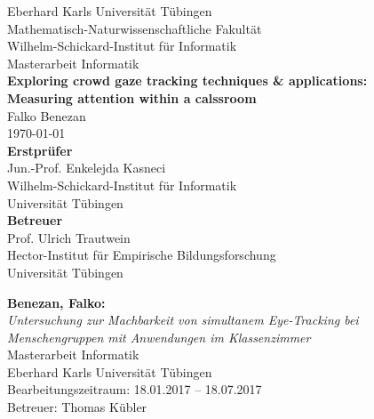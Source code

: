 \documentclass[twoside,12pt,a4paper]{scrreprt}
\begin{document}
\begin{titlepage}
	\begin{center}
		\LARGE Eberhard Karls Universität Tübingen\\
		\large Mathematisch-Naturwissenschaftliche Fakultät \\
		Wilhelm-Schickard-Institut für Informatik\\
		[3cm]
		\huge Masterarbeit Informatik\\
		[2cm]
		\Large\textbf{Exploring crowd gaze tracking techniques \& applications:\\Measuring attention within a calssroom}\\
		[1.5cm]
		\large Falko Benezan\\
		[0.5cm]
		\today\\
		\vfill
		\small\textbf{Erstprüfer}\\[0.3cm]
		\large Jun.-Prof. Enkelejda Kasneci\\
		\footnotesize Wilhelm-Schickard-Institut für Informatik\\Universität Tübingen\\
		[1cm]
		\small\textbf{Betreuer}\\[0.3cm]
		\large Prof. Ulrich Trautwein\\
		\footnotesize Hector-Institut für Empirische Bildungsforschung\\ Universität Tübingen
	\end{center}
\end{titlepage}

\thispagestyle{empty}
\vspace*{\fill}
\textbf{Benezan, Falko:}\\
\emph{Untersuchung zur Machbarkeit von simultanem Eye-Tracking bei Menschengruppen mit Anwendungen im Klassenzimmer}\\
Masterarbeit Informatik\\
Eberhard Karls Universität Tübingen\\
Bearbeitungszeitraum: 18.01.2017 -- 18.07.2017\\
Betreuer: Thomas Kübler
\newpage


\newpage

\tableofcontents
\cleardoublepage

\end{document}
